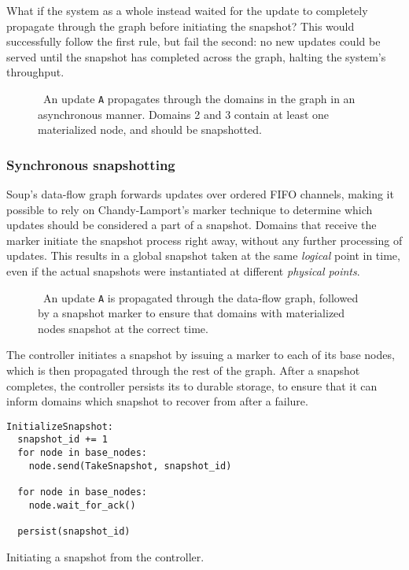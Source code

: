 What if the system as a whole instead waited for the update to completely
propagate through the graph before initiating the snapshot? This would
successfully follow the first rule, but fail the second: no new updates could be
served until the snapshot has completed across the graph, halting
the system's throughput.

\begin{figure}[H]
  \centering
  
  \caption{\
    An update \texttt{A} propagates through the domains in the graph in an
    asynchronous manner. Domains 2 and 3 contain at least one materialized node,
    and should be snapshotted.
  }\label{fig:bad-example}
\end{figure}

\subsubsection{Synchronous snapshotting}

Soup's data-flow graph forwards updates over ordered FIFO channels, making it
possible to rely on Chandy-Lamport's marker technique to determine which updates
should be considered a part of a snapshot. Domains that receive the
marker initiate the snapshot process right away, without any further processing
of updates. This results in a global snapshot taken at the same \textit{logical}
point in time, even if the actual snapshots were instantiated at different
\textit{physical points}.

\begin{figure}[H]
  \centering
  
  \caption{\
    An update \texttt{A} is propagated through the data-flow graph, followed by
    a snapshot marker to ensure that domains with materialized nodes snapshot at
    the correct time.
  }\label{good-example}
\end{figure}

The controller initiates a snapshot by issuing a  marker to
each of its base nodes, which is then propagated through the rest of the graph.
After a snapshot completes, the controller persists its \code{snapshot\_id} to
durable storage, to ensure that it can inform domains which snapshot to recover
from after a failure.

\begin{listing}[H]
  \begin{verbatim}
InitializeSnapshot:
  snapshot_id += 1
  for node in base_nodes:
    node.send(TakeSnapshot, snapshot_id)

  for node in base_nodes:
    node.wait_for_ack()

  persist(snapshot_id)
  \end{verbatim}

  \caption{Initiating a snapshot from the controller.}
\end{listing}

